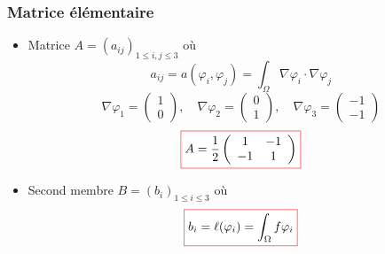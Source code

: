 \documentclass{beamer}
\newcommand{\myredbox}[1]{\fcolorbox{red}{white}{$\displaystyle#1$}}
\begin{document}
\begin{frame}
\frametitle{Matrice élémentaire}
\begin{itemize}
\item Matrice $A=(a_{ij})_{1\leq i,j \leq 3}$ où 
\[a_{ij} = a(\varphi_i,\varphi_j)=\displaystyle \int_{\Omega}\nabla \varphi_i\cdot \nabla \varphi_j\] 
\[\nabla\varphi_1=\left(\begin{array}{c} 1\\0\end{array}\right)
 ,\quad \nabla\varphi_2=\left(\begin{array}{c} 0\\1\end{array}\right),\quad \nabla\varphi_3=\left(\begin{array}{c} -1\\-1\end{array}\right)\] 
 \[\myredbox{A=\frac 12 \left(\begin{array}{cc} 1&-1\\-1&1\end{array}\right)}\]
 \item Second membre $B=(b_i)_{1\leq i\leq 3}$ où
 \[\myredbox{b_{i} = \ell(\varphi_i)=\displaystyle \int_{\Omega} f \varphi_i}\] 
\end{itemize}
\end{frame}


\end{document}
